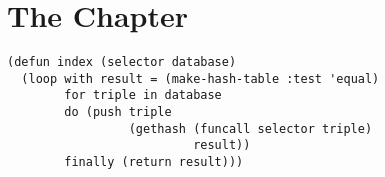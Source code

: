 \documentclass[12pt]{memoir}
\begin{document}
\chapter{The Chapter}

\lipsum[1-4]

\begin{verbatim}
(defun index (selector database)
  (loop with result = (make-hash-table :test 'equal)
        for triple in database
        do (push triple
                 (gethash (funcall selector triple)
                          result))
        finally (return result)))
\end{verbatim}

\lipsum[6-9]
\end{document}
